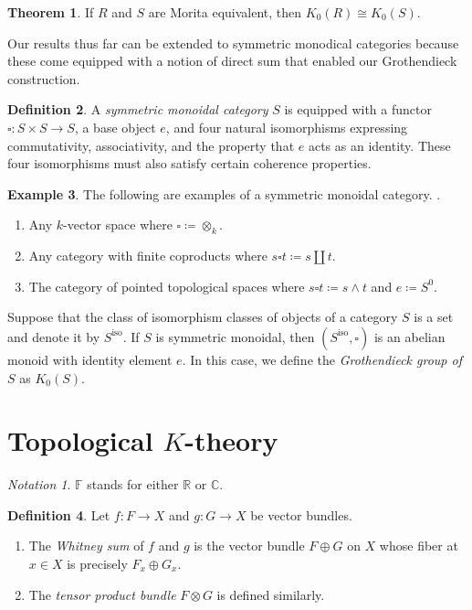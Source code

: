 \documentclass[10pt,letterpaper,cm]{nupset}
\theoremstyle{definition}
\newtheorem{definition}{Definition}[section]
\newtheorem{exmp}[definition]{Example}
\theoremstyle{theorem}
\newtheorem{theorem}[definition]{Theorem}
\theoremstyle{remark}
\newtheorem*{notation}{Notation}
\newcommand{\C}{\mathbb C}
\newcommand{\F}{\mathbb F}
\newcommand{\R}{\mathbb R}
\newcommand{\1}{\mathbf{1}}
\newcommand{\0}{\vec 0}
\DeclareMathOperator{\iso}{iso}
\begin{document}
\begin{theorem}
If $R$ and $S$ are Morita equivalent, then $K_0(R) \cong K_0(S)$.
\end{theorem}

\bigskip



Our results thus far can be extended to symmetric monodical categories because these come equipped with a notion of direct sum that enabled our Grothendieck construction. 

\begin{definition}
A \textit{symmetric monoidal category} $S$ is equipped with a functor $\square : S \times S \to S$, a base object $e$, and four natural isomorphisms expressing commutativity, associativity, and the property that $e$ acts as an identity. These four isomorphisms must also satisfy certain coherence properties.
\end{definition}

\begin{exmp} The following are examples of a symmetric monoidal category.	.
\begin{enumerate}
\item Any $k$-vector space where $\square \coloneqq \otimes_k$.
\item Any category with finite coproducts where $s \square t\coloneqq s \amalg t$.
\item The category of pointed topological spaces where $s \square t \coloneqq s \wedge t $ and $e\coloneqq S^0$.
\end{enumerate} 
\end{exmp}

Suppose that the class of isomorphism classes of objects of a category $S$ is a set and denote it by $S^{\iso}$. If $S$ is symmetric monoidal, then $\left(S^{\iso}, \square\right)$ is an abelian monoid with identity element $e$. In this case, we define the \textit{Grothendieck group of $S$} as $K_0(S)$.

\section{Topological $K$-theory}

\begin{notation}
$\F$ stands for either $\R$ or $\C$.
\end{notation}

\begin{definition}
Let $f: F \to X$ and $g: G \to X$ be vector bundles. 
\begin{enumerate}
\item The \textit{Whitney sum} of $f$ and $g$ is the vector bundle $F \oplus G$ on $X$ whose fiber at $x \in X$ is precisely $F_x \oplus G_x$.  
\item The \textit{tensor product bundle} $F \otimes G$ is defined similarly.
\end{enumerate}
\end{definition}
\end{document}
